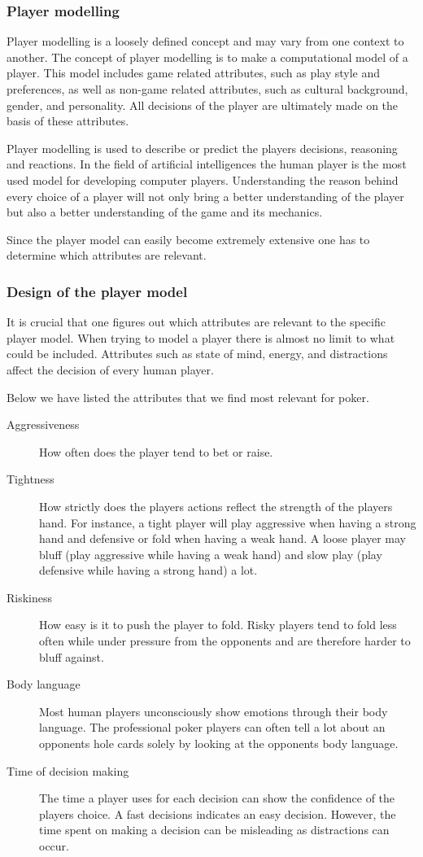 \subsubsection{Player modelling}
\label{sec:pm}
Player modelling is a loosely defined concept and may vary from one context to another. The concept of player modelling is to make a computational model of a player. This model includes game related attributes, such as play style and preferences, as well as non-game related attributes, such as cultural background, gender, and personality. All decisions of the player are ultimately made on the basis of these attributes. 

Player modelling is used to describe or predict the players decisions, reasoning and reactions. In the field of artificial intelligences the human player is the most used model for developing computer players. Understanding the reason behind every choice of a player will not only bring a better understanding of the player but also a better understanding of the game and its mechanics.

Since the player model can easily become extremely extensive one has to determine which attributes are relevant.

\subsubsection{Design of the player model}
It is crucial that one figures out which attributes are relevant to the specific player model. When trying to model a player there is almost no limit to what could be included. Attributes such as state of mind, energy, and distractions affect the decision of every human player.  

Below we have listed the attributes that we find most relevant for poker.

\begin{description}
\item[Aggressiveness] How often does the player tend to bet or raise.
\item[Tightness] How strictly does the players actions reflect the strength of the players hand. For instance, a tight player will play aggressive when having a strong hand and defensive or fold when having a weak hand. A loose player may bluff (play aggressive while having a weak hand) and slow play (play defensive while having a strong hand) a lot.
\item[Riskiness] How easy is it to push the player to fold. Risky players tend to fold less often while under pressure from the opponents and are therefore harder to bluff against.
\item[Body language] Most human players unconsciously show emotions through their body language. The professional poker players can often tell a lot about an opponents hole cards solely by looking at the opponents body language.
\item[Time of decision making] The time a player uses for each decision can show the confidence of the players choice. A fast decisions indicates an easy decision. However, the time spent on making a decision can be misleading as distractions can occur.
\end{description}

